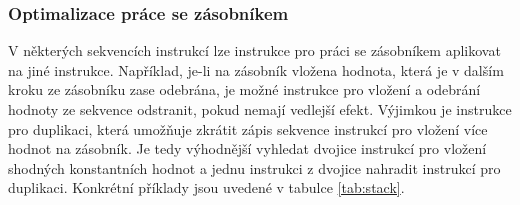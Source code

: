 \subsubsection{Optimalizace práce se zásobníkem}

V některých sekvencích instrukcí lze instrukce pro práci se zásobníkem aplikovat na jiné instrukce. Například, je-li na zásobník vložena hodnota, která je v dalším kroku ze zásobníku zase odebrána, je možné instrukce pro vložení a odebrání hodnoty ze sekvence odstranit, pokud nemají vedlejší efekt. Výjimkou je instrukce pro duplikaci, která umožňuje zkrátit zápis sekvence instrukcí pro vložení více hodnot na zásobník. Je tedy výhodnější vyhledat dvojice instrukcí pro vložení shodných konstantních hodnot a jednu instrukci z dvojice nahradit instrukcí pro duplikaci. Konkrétní příklady jsou uvedené v tabulce \ref{tab:stack}.



